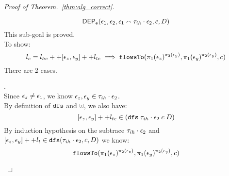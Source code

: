 \begin{proof}[Proof of Theorem.~\ref{thm:alg_correct}]
\begin{case}
\begin{subcase}
\[
  \mathsf{DEP_{\mathtt{e}}}(\mathtt{\epsilon}_1, \mathtt{\epsilon}_2, \mathtt{\epsilon}_1 \smallfrown \mathtt{\tau}_{ih} \cdot \mathtt{\epsilon}_2, {c}, D) 
  \]
This sub-goal is proved.
\\
To show:
\[  
  l_e = l_{he} ++ [\mathtt{\epsilon}_z, \mathtt{\epsilon}_y] ++ l_{te}
  \implies
\mathtt{flowsTo}(\pi_1(\mathtt{\epsilon}_z)^{\pi_2(\mathtt{\epsilon}_y)}, \pi_1(\mathtt{\epsilon}_y)^{\pi_2(\mathtt{\epsilon}_y)}, c)
\]
There are 2 cases.
\begin{subsubcase}.
%
%
\\
Since $\mathtt{\epsilon}_z \neq \mathtt{\epsilon}_1$, we know $\mathtt{\epsilon}_z, \mathtt{\epsilon}_y \in \mathtt{\tau}_{ih} \cdot \mathtt{\epsilon}_2$.
\\
By definition of $\mathtt{dfs}$ and $\uplus$,  we also have:
\[
  [\mathtt{\epsilon}_z, \mathtt{\epsilon}_y] ++ l_{te} \in (\mathtt{dfs} \; {\mathtt{\tau}_{ih} \cdot \mathtt{\epsilon}_2} \; c \; D)
\]
%
%
%
By induction hypothesis on the subtrace $\mathtt{\tau}_{ih} \cdot \mathtt{\epsilon}_2$ and $[\mathtt{\epsilon}_z, \mathtt{\epsilon}_y] ++ l_t 
  \in \mathtt{dfs}(\mathtt{\tau}_{ih} \cdot \mathtt{\epsilon}_2, c, D)$ we know:
\[
  \mathtt{flowsTo}(\pi_1(\mathtt{\epsilon}_z)^{\pi_2(\mathtt{\epsilon}_z)}, \pi_1(\mathtt{\epsilon}_y)^{\pi_2(\mathtt{\epsilon}_y)}, c)
\]
\end{subsubcase}
\end{subcase}
\end{case}
\end{proof}
